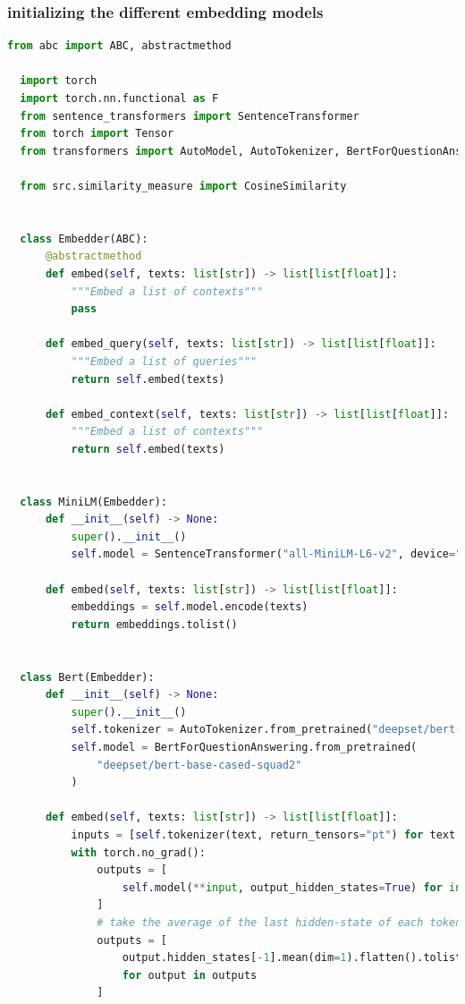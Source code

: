 \documentclass[a4paper,12pt]{article}
\begin{document}
\subsubsection{initializing the different embedding models}
\begin{lstlisting}[language=Python]
  from abc import ABC, abstractmethod

  import torch
  import torch.nn.functional as F
  from sentence_transformers import SentenceTransformer
  from torch import Tensor
  from transformers import AutoModel, AutoTokenizer, BertForQuestionAnswering
  
  from src.similarity_measure import CosineSimilarity
  
  
  class Embedder(ABC):
      @abstractmethod
      def embed(self, texts: list[str]) -> list[list[float]]:
          """Embed a list of contexts"""
          pass
  
      def embed_query(self, texts: list[str]) -> list[list[float]]:
          """Embed a list of queries"""
          return self.embed(texts)
  
      def embed_context(self, texts: list[str]) -> list[list[float]]:
          """Embed a list of contexts"""
          return self.embed(texts)
  
  
  class MiniLM(Embedder):
      def __init__(self) -> None:
          super().__init__()
          self.model = SentenceTransformer("all-MiniLM-L6-v2", device="cpu")
  
      def embed(self, texts: list[str]) -> list[list[float]]:
          embeddings = self.model.encode(texts)
          return embeddings.tolist()
  
  
  class Bert(Embedder):
      def __init__(self) -> None:
          super().__init__()
          self.tokenizer = AutoTokenizer.from_pretrained("deepset/bert-base-cased-squad2")
          self.model = BertForQuestionAnswering.from_pretrained(
              "deepset/bert-base-cased-squad2"
          )
  
      def embed(self, texts: list[str]) -> list[list[float]]:
          inputs = [self.tokenizer(text, return_tensors="pt") for text in texts]
          with torch.no_grad():
              outputs = [
                  self.model(**input, output_hidden_states=True) for input in inputs
              ]
              # take the average of the last hidden-state of each token to represent the sentence
              outputs = [
                  output.hidden_states[-1].mean(dim=1).flatten().tolist()
                  for output in outputs
              ]
  

\end{lstlisting}
\end{document}
